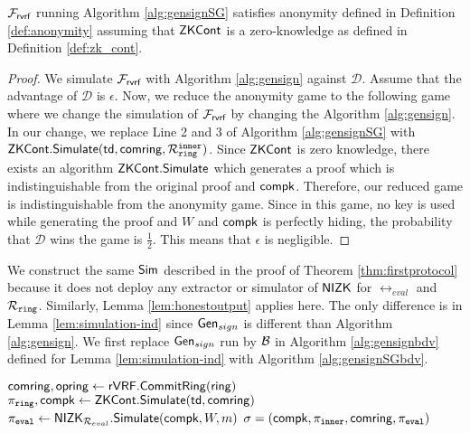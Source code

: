 \begin{lemma} \label{lem:anonymitySG} $ \mathcal{F}_{\textsf{rvrf}} $ running Algorithm \ref{alg:gensignSG} satisfies anonymity defined in Definition \ref{def:anonymity} assuming that ${\mathsf{ZKCont}} $ is a zero-knowledge as defined in Definition \ref{def:zk_cont}.
\end{lemma}

\begin{proof}
We simulate $ \mathcal{F}_{\textsf{rvrf}} $ with Algorithm \ref{alg:gensign} against $ \mathcal{D} $. Assume that the advantage of $ \mathcal{D} $ is $ \epsilon $. Now, we reduce the anonymity game to the following game where we change the simulation of $ \mathcal{F}_{\textsf{rvrf}} $ by changing the Algorithm \ref{alg:gensign}. In our change, we replace Line 2 and 3 of Algorithm \ref{alg:gensignSG} with $ {\mathsf{ZKCont}}.{\mathsf{Simulate}}(\mathsf{td}, \mathsf{comring},\mathcal{R}_{\mathtt{ring}}^{\mathtt{inner}}) $. Since $ {\mathsf{ZKCont}}$ is zero knowledge, there exists an algorithm  $ {\mathsf{ZKCont}}.{\mathsf{Simulate}}$ which generates a proof which is indistinguishable from the original proof and $ \mathsf{compk} $. Therefore, our reduced game is indistinguishable from the anonymity game. Since in this game, no  key is used while generating the proof and $ W $ and $ \mathsf{compk} $ is perfectly hiding, the probability that  $ \mathcal{D} $ wins the game is $ \frac{1}{2} $. This means that $ \epsilon $ is negligible.		
\end{proof}


We construct the same $ \mathsf{Sim} $ described in the proof of Theorem \ref{thm:firstprotocol} because it does not deploy any extractor or simulator of $ {\mathsf{NIZK}} $ for $ \rel_{eval} $ and $ \mathcal{R}_{\mathtt{ring}} $. Similarly, Lemma \ref{lem:honestoutput} applies here. The only difference is in Lemma \ref{lem:simulation-ind} since $ \mathsf{Gen}_{sign} $ is different than Algorithm \ref{alg:gensign}.
We first replace $ \mathsf{Gen}_{sign} $ run by $ \mathcal{B} $ in Algorithm \ref{alg:gensignbdv} defined for Lemma \ref{lem:simulation-ind} with Algorithm \ref{alg:gensignSGbdv}.

\begin{algorithm}
\caption{$\gen_{sign}(\ring,W,\pk,\aux,m)$}
\label{alg:gensignSGbdv}	 	
\begin{algorithmic}[1]
	\State $ \mathsf{comring}, \mathsf{opring} \leftarrow {\ensuremath{\mathsf{rVRF}}}.{\mathsf{CommitRing}}(\mathsf{ring}) $
	\State $ \pi_{\mathtt{ring}},\mathsf{compk} \leftarrow {\ensuremath{\mathsf{ZKCont}}}.{\mathsf{Simulate}}(\mathsf{td},\mathsf{comring}) $ 
	\State $ \pi_{\mathtt{eval}} \leftarrow {\ensuremath{\mathsf{NIZK}}}_{\mathcal{R}_{eval}}.{\mathsf{Simulate}}(\mathsf{compk}, W,m) $
	\State\Return$ \sigma = (\mathsf{compk}, \pi_{\mathtt{inner}},\mathsf{comring}, \pi_{\mathtt{eval}}) $
\end{algorithmic}

\end{algorithm}

